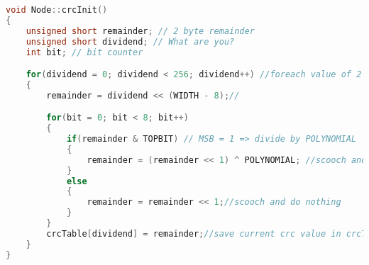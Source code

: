 \begin{lstlisting}[language=C]
void Node::crcInit()
{
    unsigned short remainder; // 2 byte remainder
    unsigned short dividend; // What are you?
    int bit; // bit counter

    for(dividend = 0; dividend < 256; dividend++) //foreach value of 2 bytes/8 bits
    { 
        remainder = dividend << (WIDTH - 8);//

        for(bit = 0; bit < 8; bit++)
        {
            if(remainder & TOPBIT) // MSB = 1 => divide by POLYNOMIAL
            { 
                remainder = (remainder << 1) ^ POLYNOMIAL; //scooch and divide
            }
            else
            {
                remainder = remainder << 1;//scooch and do nothing
            }
        }
        crcTable[dividend] = remainder;//save current crc value in crcTable
    }
}
\end{lstlisting}
